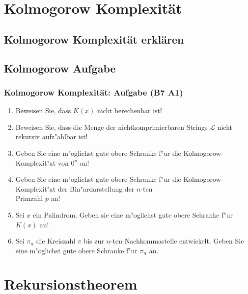 



\section{Kolmogorow Komplexität}
\subsection{Kolmogorow Komplexität erklären}
\subsection{Kolmogorow Aufgabe}
\begin{frame}
	\frametitle{Kolmogorow Komplexität: Aufgabe (B7 A1)}
	\begin{enumerate}
		\item Beweisen Sie, dass $K(x)$ nicht berechenbar ist!
		\item Beweisen Sie, dass die Menge der nichtkomprimierbaren Strings $\mathcal{L}$
		nicht rekursiv aufz"ahlbar ist!
		\item Geben Sie eine m"oglichst gute obere Schranke f"ur die Kolmogorow-Komplexit"at von $0^n$ an!
		\item Geben Sie eine m"oglichst gute obere Schranke f"ur die Kolmogorow-Komplexit"at der
		Bin"ardarstellung der $n$-ten\\ Primzahl $p$ an!
		\item Sei $x$ ein Palindrom. Geben sie eine m"oglichst gute obere Schranke f"ur $K(x)$ an!
		\item Sei $\pi_n$ die Kreiszahl $\pi$ bis zur $n$-ten Nachkommastelle entwickelt. Geben Sie eine m"oglichst gute obere Schranke f"ur $\pi_n$ an.
	\end{enumerate}
\end{frame}

\section{Rekursionstheorem}

